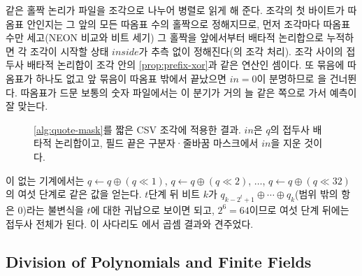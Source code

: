 같은 홀짝 논리가 파일을 조각으로 나누어 병렬로 읽게 해 준다. 조각의 첫 바이트가 따옴표 안인지는 그 앞의 모든 따옴표 수의 홀짝으로 정해지므로, 먼저 조각마다 따옴표 수만 세고(NEON 비교와 비트 세기) 그 홀짝을 앞에서부터 배타적 논리합으로 누적하면 각 조각이 시작할 상태 $\mathit{inside}$가 추측 없이 정해진다(의 조각 처리). 조각 사이의 접두사 배타적 논리합이 조각 안의 \cref{prop:prefix-xor}과 같은 연산인 셈이다. 또 묶음에 따옴표가 하나도 없고 앞 묶음이 따옴표 밖에서 끝났으면 $\mathit{in}=0$이 분명하므로 을 건너뛴다. 따옴표가 드문 보통의 숫자 파일에서는 이 분기가 거의 늘 같은 쪽으로 가서 예측이 잘 맞는다.

\begin{figure}[htbp]
\centering
{}
\caption{\cref{alg:quote-mask}를 짧은 CSV 조각에 적용한 결과. $\mathit{in}$은 $q$의 접두사 배타적 논리합이고, 필드 끝은 구분자·줄바꿈 마스크에서 $\mathit{in}$을 지운 것이다.}
\label{fig:quote-mask}
\end{figure}

이 없는 기계에서는 $q\gets q\oplus(q\ll1)$, $q\gets q\oplus(q\ll2)$, $\dots$, $q\gets q\oplus(q\ll32)$의 여섯 단계로 같은 값을 얻는다. $t$단계 뒤 비트 $k$가 $q_{k-2^t+1}\oplus\cdots\oplus q_k$(범위 밖의 항은 $0$)라는 불변식을 $t$에 대한 귀납으로 보이면 되고, $2^6=64$이므로 여섯 단계 뒤에는 접두사 전체가 된다. 이 사다리도 에서 곱셈 결과와 견주었다.

\subsection{Division of Polynomials and Finite Fields}

